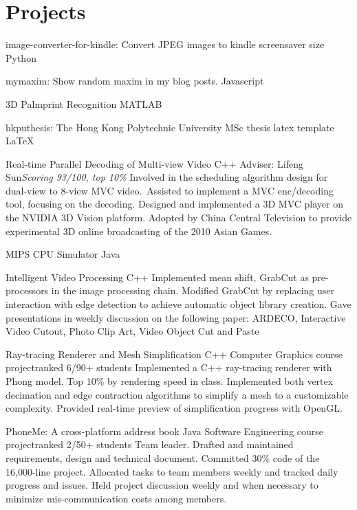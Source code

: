 \documentclass[11pt,a4paper]{moderncv/moderncv}
\begin{document}
\section{Projects}
{image-converter-for-kindle: Convert JPEG images to kindle screensaver size}
{Python}
{}{}
{
}

{mymaxim: Show random maxim in my blog posts.}
{Javascript}
{}{}
{
}

{3D Palmprint Recognition}
{MATLAB}
{}{}
{
}

{hkputhesis: The Hong Kong Polytechnic University MSc thesis latex template}
{LaTeX}
{}{}
{
}

{Real-time Parallel Decoding of Multi-view Video}
{C++}
{Adviser: Lifeng Sun}{\textit{Scoring 93/100, top 10\%}}
{
Involved in the scheduling algorithm design for dual-view to 8-view MVC video.\
Assisted to implement a MVC enc/decoding tool, focusing on the decoding.
Designed and implemented a 3D MVC player on the NVIDIA 3D Vision platform.
Adopted by China Central Television to provide experimental 3D online broadcasting of the 2010 Asian Games.
}

{MIPS CPU Simulator}
{Java}
{}{}
{
}

{Intelligent Video Processing}
{C++}
{}{}
{
Implemented mean shift, GrabCut as pre-processors in the image processing chain.
Modified GrabCut by replacing user interaction with edge detection to achieve automatic object library creation.
Gave presentations in weekly discussion on the following paper: ARDECO, Interactive Video Cutout, Photo Clip Art, Video Object Cut and Paste
}

{Ray-tracing Renderer and Mesh Simplification}
{C++}
{Computer Graphics course project}{ranked 6/90+ students}
{
Implemented a C++ ray-tracing renderer with Phong model.
Top 10\% by rendering speed in class.
Implemented both vertex decimation and edge contraction algorithms to simplify a mesh to a customizable complexity.
Provided real-time preview of simplification progress with OpenGL.\
}

{PhoneMe: A cross-platform address book}
{Java}
{Software Engineering course project}{ranked 2/50+ students}
{
Team leader.
Drafted and maintained requirements, design and technical document.
Committed 30\% code of the 16,000-line project.
Allocated tasks to team members weekly and tracked daily progress and issues.
Held project discussion weekly and when necessary to minimize mis-communication costs among members.
}
\end{document}
